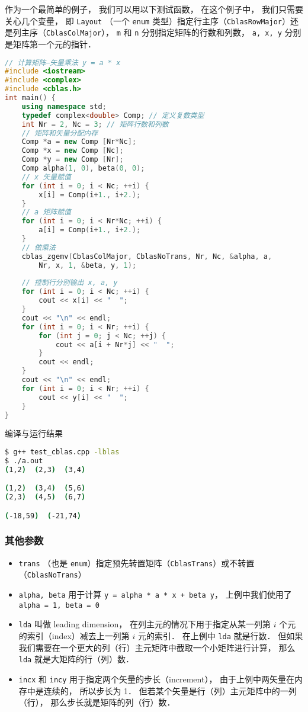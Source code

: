 作为一个最简单的例子， 我们可以用以下测试函数， 在这个例子中， 我们只需要关心几个变量， 即 \lstinline|Layout| （一个 \lstinline|enum| 类型）指定行主序（\lstinline|CblasRowMajor|）还是列主序（\lstinline|CblasColMajor|）， \lstinline|m| 和 \lstinline|n| 分别指定矩阵的行数和列数， \lstinline|a, x, y| 分别是矩阵第一个元的指针．
\begin{lstlisting}[language=cpp]
// 计算矩阵—矢量乘法 y = a * x
#include <iostream>
#include <complex>
#include <cblas.h>
int main() {
    using namespace std;
    typedef complex<double> Comp; // 定义复数类型
    int Nr = 2, Nc = 3; // 矩阵行数和列数
    // 矩阵和矢量分配内存
    Comp *a = new Comp [Nr*Nc];
    Comp *x = new Comp [Nc];
    Comp *y = new Comp [Nr];
    Comp alpha(1, 0), beta(0, 0);
    // x 矢量赋值
    for (int i = 0; i < Nc; ++i) {
        x[i] = Comp(i+1., i+2.);
    }
    // a 矩阵赋值
    for (int i = 0; i < Nr*Nc; ++i) {
        a[i] = Comp(i+1., i+2.);
    }
    // 做乘法
    cblas_zgemv(CblasColMajor, CblasNoTrans, Nr, Nc, &alpha, a,
        Nr, x, 1, &beta, y, 1);
        
    // 控制行分别输出 x, a, y
    for (int i = 0; i < Nc; ++i) {
        cout << x[i] << "  ";
    }
    cout << "\n" << endl;
    for (int i = 0; i < Nr; ++i) {
        for (int j = 0; j < Nc; ++j) {
            cout << a[i + Nr*j] << "  ";
        }
        cout << endl;
    }
    cout << "\n" << endl;
    for (int i = 0; i < Nr; ++i) {
        cout << y[i] << "  ";
    }
}
\end{lstlisting}

编译与运行结果
\begin{lstlisting}[language=bash]
$ g++ test_cblas.cpp -lblas
$ ./a.out
(1,2)  (2,3)  (3,4)

(1,2)  (3,4)  (5,6)
(2,3)  (4,5)  (6,7)

(-18,59)  (-21,74)
\end{lstlisting}

\subsubsection{其他参数}
\begin{itemize}
\item \lstinline|trans| （也是 \lstinline|enum|）指定预先转置矩阵（\lstinline|CblasTrans|）或不转置（\lstinline|CblasNoTrans|）
\item \lstinline|alpha, beta| 用于计算 \lstinline|y = alpha * a * x + beta y|， 上例中我们使用了 \lstinline|alpha = 1, beta = 0|
\item \lstinline|lda| 叫做 leading dimension， 在列主元的情况下用于指定从某一列第 $i$ 个元的索引（index）减去上一列第 $i$ 元的索引． 在上例中 \lstinline|lda| 就是行数． 但如果我们需要在一个更大的列（行）主元矩阵中截取一个小矩阵进行计算， 那么 \lstinline|lda| 就是大矩阵的行（列）数．
\item \lstinline|incx| 和 \lstinline|incy| 用于指定两个矢量的步长（increment）， 由于上例中两矢量在内存中是连续的， 所以步长为 1． 但若某个矢量是行（列）主元矩阵中的一列（行）， 那么步长就是矩阵的列（行）数．
\end{itemize}
